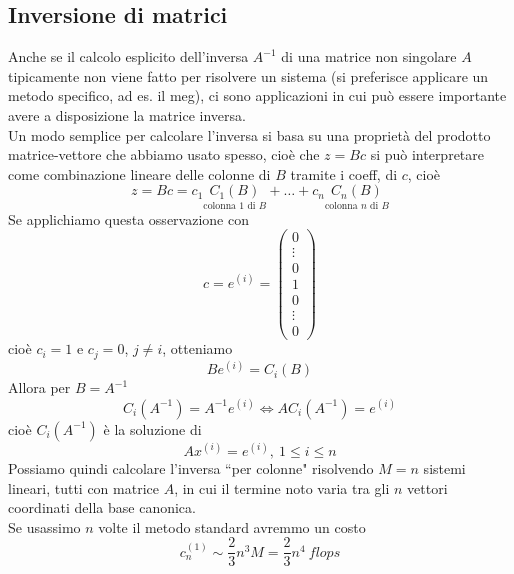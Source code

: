 \documentclass[12pt,a4paper]{article}
\begin{document}
\subsection{Inversione di matrici}
Anche se il calcolo esplicito dell'inversa $A^{-1}$ di una matrice non singolare $A$ tipicamente non viene fatto per risolvere un sistema (si preferisce applicare un metodo specifico, ad es. il meg), ci sono applicazioni in cui può essere importante avere a disposizione la matrice inversa. \\
Un modo semplice per calcolare l'inversa si basa su una proprietà del prodotto matrice-vettore che abbiamo usato spesso, cioè che $z=Bc$ si può interpretare come combinazione lineare delle colonne di $B$ tramite i coeff, di $c$, cioè
\begin{equation*}
    z=Bc=c_1\underset{\text{colonna 1 di $B$}}{C_1(B)}+\dots+c_n\underset{\text{colonna $n$ di $B$}}{C_n(B)}
\end{equation*}
Se applichiamo questa osservazione con
\begin{equation*}
    c=e^{(i)}=\begin{pmatrix}
    0 \\
    \vdots \\
    0 \\
    1 \\
    0 \\
    \vdots \\
    0
    \end{pmatrix}
\end{equation*}
cioè $c_i = 1$ e $c_j = 0$, $j \neq i$, otteniamo
\begin{equation*}
    Be^{(i)} = C_i(B)
\end{equation*}
Allora per $B=A^{-1}$
\begin{equation*}
    C_i(A^{-1})=A^{-1}e^{(i)} \Leftrightarrow AC_i(A^{-1})=e^{(i)}
\end{equation*}
cioè $C_i(A^{-1})$ è la soluzione di
\begin{equation*}
    Ax^{(i)} = e^{(i)}, \ 1\leq i \leq n
\end{equation*}
Possiamo quindi calcolare l'inversa ``per colonne" risolvendo $M=n$ sistemi lineari, tutti con matrice $A$, in cui il termine noto varia tra gli $n$ vettori coordinati della base canonica. \\
Se usassimo $n$ volte il metodo standard avremmo un costo
\begin{equation*}
    c_n^{(1)} \sim \frac{2}{3}n^3M = \frac{2}{3}n^4 \ flops
\end{equation*}
\end{document}
